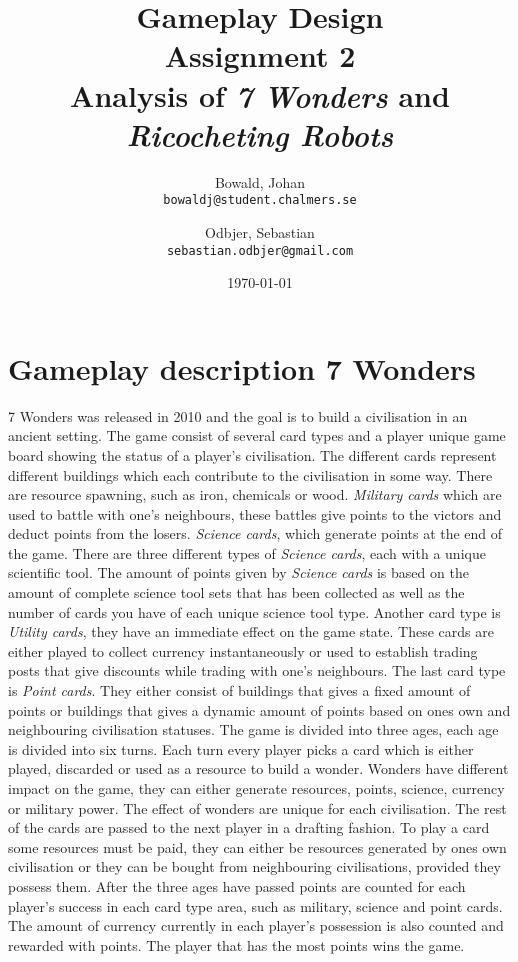 \documentclass[a4paper]{article}
\title{Gameplay Design \\ Assignment 2 \\ Analysis of \textit{7 Wonders} and \textit{Ricocheting Robots} }
\author{
  Bowald, Johan\\
  \texttt{bowaldj@student.chalmers.se}
  \and
  Odbjer, Sebastian\\
  \texttt{sebastian.odbjer@gmail.com}
}
\date{\today}
\begin{document}
\maketitle
\newpage
\tableofcontents{}
\newpage

\section{Gameplay description 7 Wonders}
\label{sec:what7wond}
7 Wonders was released in 2010 and the goal is to build a civilisation in an ancient setting.
The game consist of several card types and a player unique game board showing the status of a player's civilisation.
The different cards represent different buildings which each contribute to the civilisation in some way.
There are resource spawning, such as iron, chemicals or wood. \textit{Military cards} which are used to battle with one's neighbours, these battles give points to the victors and deduct points from the losers.
\textit{Science cards}, which generate points at the end of the game. There are three different types of \textit{Science cards}, each with a unique scientific tool.
The amount of points given by \textit{Science cards} is based on the amount of complete science tool sets that has been collected as well as the number of cards you have of each unique science tool type.
Another card type is \textit{Utility cards}, they have an immediate effect on the game state.
These cards are either played to collect currency instantaneously or used to establish trading posts that give discounts while trading with one's neighbours.
The last card type is \textit{Point cards}.
They either consist of buildings that gives a fixed amount of points or buildings that gives a dynamic amount of points based on ones own and neighbouring civilisation statuses.
The game is divided into three ages, each age is divided into six turns.
Each turn every player picks a card which is either played, discarded or used as a resource to build a wonder.
Wonders have different impact on the game, they can either generate resources, points, science, currency or military power.
The effect of wonders are unique for each civilisation.
The rest of the cards are passed to the next player in a drafting fashion.
To play a card some resources must be paid, they can either be resources generated by ones own civilisation or they can be bought from neighbouring civilisations, provided they possess them.
After the three ages have passed points are counted for each player's success in each card type area, such as military, science and point cards.
The amount of currency currently in each player's possession is also counted and rewarded with points.
The player that has the most points wins the game.
\end{document}
